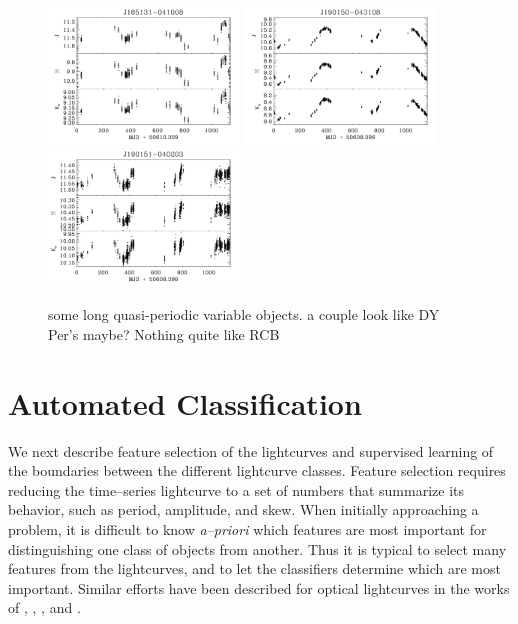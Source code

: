 \documentclass[]{emulateapj}
\begin{document}
\begin{figure}[]
\includegraphics[width=2.0in]{new_plots/ll_36}
\includegraphics[width=2.0in]{new_plots/ll_40}
\includegraphics[width=2.0in]{new_plots/ll_41}
\caption{some long quasi-periodic variable objects. a couple look like DY Per's maybe? Nothing quite like RCB}
\label{ll}
\end{figure}




\section{Automated Classification}

We next describe feature selection of the lightcurves and supervised
learning of the boundaries between the different lightcurve classes.
Feature selection requires reducing the time--series lightcurve to a
set of numbers that summarize its behavior, such as period, amplitude,
and skew.  When initially approaching a problem, it is difficult to
know {\it a--priori} which features are most important for
distinguishing one class of objects from another.  Thus it is typical
to select many features from the lightcurves, and to let the
classifiers determine which are most important.  Similar efforts have
been described for optical lightcurves in the works of
\cite{2008AN....329..288M}, \cite{2011ApJ...733...10R},
\cite{2012MNRAS.427.2917R}, and \cite{LINEAR-3}.
\end{document}
